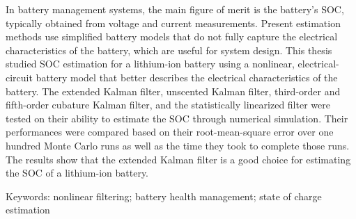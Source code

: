 In battery management systems, the main figure of merit is the battery's SOC, typically obtained from voltage and current measurements.
Present estimation methods use simplified battery models that do not fully capture the electrical characteristics of the battery, which are useful for system design.
This thesis studied SOC estimation for a lithium-ion battery using a nonlinear, electrical-circuit battery model that better describes the electrical characteristics of the battery.
The extended Kalman filter, unscented Kalman filter, third-order and fifth-order cubature Kalman filter, and the statistically linearized filter were tested on their ability to estimate the SOC through numerical simulation.
Their performances were compared based on their root-mean-square error over one hundred Monte Carlo runs as well as the time they took to complete those runs.
The results show that the extended Kalman filter is a good choice for estimating the SOC of a lithium-ion battery.

\vfill

\noindent Keywords: nonlinear filtering; battery health management; state of charge \mbox{estimation}

